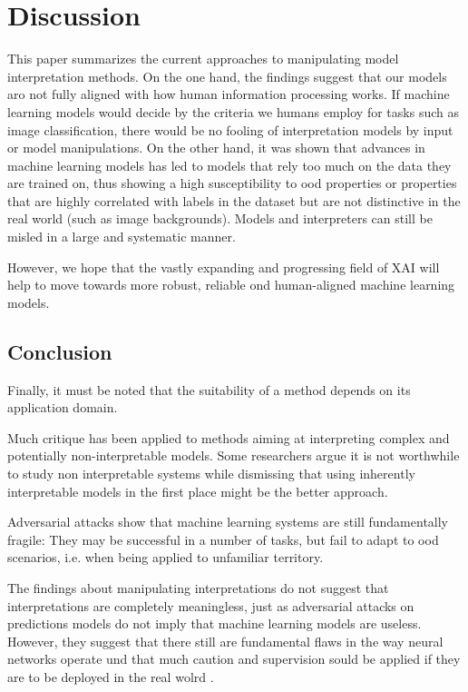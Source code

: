 \section{Discussion}

This paper summarizes the current approaches to manipulating model interpretation methods. 
On the one hand, the findings suggest that our models aro not fully aligned with how human information processing works. If machine learning models would decide by the criteria we humans employ for tasks such as image classification, there would be no fooling of interpretation models by input or model manipulations. 
On the other hand, it was shown that advances in machine learning models has led to models that rely too much on the data they are trained on, thus showing a high susceptibility to ood properties or properties that are highly correlated with labels in the dataset but are not distinctive in the real world (such as image backgrounds). Models and interpreters can still be misled in a large and systematic manner. 

However, we hope that the vastly expanding and progressing field of XAI will help to move towards more robust, reliable ond human-aligned machine learning models. 

\subsection{Conclusion}
Finally, it must be noted that the suitability of a method depends on its application domain. 


Much critique has been applied to methods aiming at interpreting complex and potentially non-interpretable models. 
Some researchers argue it is not worthwhile to study non interpretable systems while dismissing that using inherently interpretable models in the first place might be the better approach. 

Adversarial attacks show that machine learning systems are still fundamentally fragile: They may be successful in a number of tasks, but fail to adapt to ood scenarios, i.e. when being applied to unfamiliar territory. 

 The findings about manipulating interpretations do not suggest that interpretations are completely meaningless, just as adversarial attacks on predictions models do not imply that machine learning models are useless. However, they suggest that there still are fundamental flaws in the way neural networks operate und that much caution and supervision sould be applied if they are to be deployed in the real wolrd .


